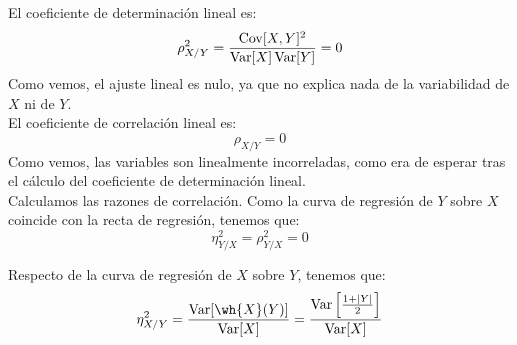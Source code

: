 \begin{ejercicio}
\begin{figure}[H]
    \end{figure}

    El coeficiente de determinación lineal es:
    \begin{equation*}
        \rho_{X/Y}^2 = \dfrac{\operatorname{Cov}[X,Y]^2}{\operatorname{Var}[X]\operatorname{Var}[Y]} = 0
    \end{equation*}
    Como vemos, el ajuste lineal es nulo, ya que no explica nada de la variabilidad de $X$ ni de $Y$.\\

    El coeficiente de correlación lineal es:
    \begin{equation*}
        \rho_{X/Y} = 0
    \end{equation*}
    Como vemos, las variables son linealmente incorreladas, como era de esperar tras el cálculo del coeficiente de determinación lineal.\\

    Calculamos las razones de correlación. Como la curva de regresión de $Y$ sobre $X$ coincide con la recta de regresión, tenemos que:
    \begin{equation*}
        \eta_{Y/X}^2 = \rho_{Y/X}^2 = 0
    \end{equation*}

    Respecto de la curva de regresión de $X$ sobre $Y$, tenemos que:
    \begin{equation*}
        \eta_{X/Y}^2 = \dfrac{\Var[\wh{X}(Y)]}{\Var[X]} = \dfrac{\Var\left[\frac{1+|Y|}{2}\right]}{\Var[X]}
    \end{equation*}


\end{ejercicio}

